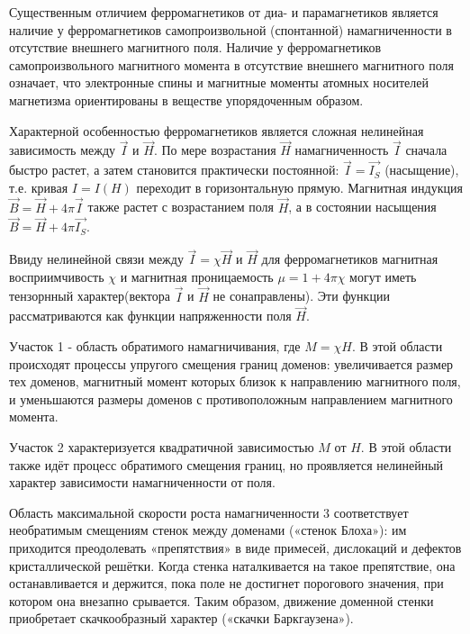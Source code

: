 \documentclass[a4paper,14pt]{article} %
\begin{document}
Существенным отличием ферромагнетиков от диа- и парамагнетиков является наличие у ферромагнетиков самопроизвольной (спонтанной) намагниченности в отсутствие внешнего магнитного поля. Наличие у ферромагнетиков самопроизвольного магнитного момента в отсутствие внешнего магнитного поля означает, что электронные спины и магнитные моменты атомных носителей магнетизма ориентированы в веществе упорядоченным образом.

Характерной особенностью ферромагнетиков является сложная нелинейная зависимость между $\overrightarrow{I}$ и $\overrightarrow{H}$. По мере возрастания $\overrightarrow{H}$ намагниченность $\overrightarrow{I}$ сначала быстро растет, а затем становится практически постоянной: $\overrightarrow{I} = \overrightarrow{I_S}$ (насыщение), т.е. кривая $I = I(H)$ переходит в горизонтальную прямую. Магнитная индукция $\overrightarrow{B} = \overrightarrow{H} + 4\pi\overrightarrow{I}$ также растет с возрастанием поля $\overrightarrow{H}$, а в состоянии насыщения $\overrightarrow{B} = \overrightarrow{H} + 4\pi\overrightarrow{I_S}$.

Ввиду нелинейной связи между $\overrightarrow{I} = \chi\overrightarrow{H}$ и $\overrightarrow{H}$ для ферромагнетиков магнитная восприимчивость $\chi$ и магнитная проницаемость $\mu = 1 + 4\pi\chi$ могут иметь тензорнный характер(вектора $\overrightarrow{I}$ и $\overrightarrow{H}$ не сонаправлены). Эти функции рассматриваются как функции напряженности поля $\overrightarrow{H}$.

Участок 1 - область обратимого намагничивания, где $M=\chi H$. В этой области происходят процессы упругого смещения границ доменов: увеличивается размер тех доменов, магнитный момент которых близок к направлению магнитного поля, и уменьшаются размеры доменов с противоположным направлением магнитного момента.

Участок 2 характеризуется квадратичной зависимостью $M$ от $H .$ В этой области также идёт процесс обратимого смещения границ, но проявляется нелинейный характер зависимости намагниченности от поля.

Область максимальной скорости роста намагниченности 3 соответствует необратимым смещениям стенок между доменами («стенок Блоха»): им приходится преодолевать «препятствия» в виде примесей, дислокаций и дефектов кристаллической решётки. Когда стенка наталкивается на такое препятствие, она останавливается и держится, пока поле не достигнет порогового значения, при котором она внезапно срывается. Таким образом, движение доменной стенки приобретает скачкообразный характер («скачки Баркгаузена»).
\end{document}
